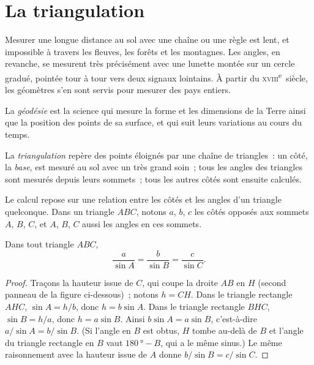 \section{La triangulation}

Mesurer une longue distance au sol avec une chaîne ou une règle est lent,
et impossible à travers les fleuves, les forêts et les montagnes. Les
angles, en revanche, se mesurent très précisément avec une lunette montée
sur un cercle gradué, pointée tour à tour vers deux signaux lointains. À
partir du \textsc{xviii}\textsuperscript{e}~siècle, les géomètres s'en sont
servis pour mesurer des pays entiers.

\begin{definition}[Géodésie]\label{def:g10:measuring-the-earth:geodesy}
La \emph{géodésie} est la science qui mesure la
forme et les dimensions de la Terre ainsi que la position des points de sa
surface, et qui suit leurs variations au cours du temps.
\end{definition}

\begin{definition}[Triangulation]\label{def:g10:measuring-the-earth:triangulation}
La \emph{triangulation} repère des points éloignés par
une chaîne de triangles~: un côté, la \emph{base}, est mesuré au sol avec un
très grand soin~; tous les angles des triangles sont mesurés depuis leurs
sommets~; tous les autres côtés sont ensuite calculés.
\end{definition}

Le calcul repose sur une relation entre les côtés et les angles d'un
triangle quelconque. Dans un triangle $ABC$, notons $a$, $b$, $c$ les côtés
opposés aux sommets $A$, $B$, $C$, et $A$, $B$, $C$ aussi les angles en ces
sommets.

\begin{proposition}\label{prop:g10:measuring-the-earth:sine-rule}
Dans tout triangle $ABC$,
\[
  \frac{a}{\sin A} = \frac{b}{\sin B} = \frac{c}{\sin C}.
\]
\end{proposition}

\begin{proof}
Traçons la hauteur issue de $C$, qui coupe la droite $AB$ en $H$ (second
panneau de la figure ci-dessous)~; notons $h = CH$. Dans le triangle
rectangle $AHC$, $\sin A = h/b$, donc $h = b \sin A$. Dans le triangle
rectangle $BHC$, $\sin B = h/a$, donc $h = a \sin B$. Ainsi
$b \sin A = a \sin B$, c'est-à-dire $a/\sin A = b/\sin B$. (Si l'angle en
$B$ est obtus, $H$ tombe au-delà de $B$ et l'angle du triangle rectangle
en $B$ vaut $\qty{180}{\degree} - B$, qui a le même sinus.) Le même
raisonnement avec la hauteur issue de $A$ donne $b/\sin B = c/\sin C$.
\end{proof}


